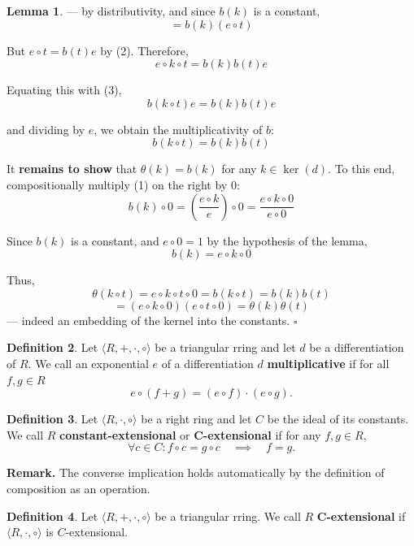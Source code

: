 \documentclass[12pt]{article}
\theoremstyle{definition}
\newtheorem{definition}{Definition}[section]
\newtheorem{lemma}[definition]{Lemma}
\begin{document}
\begin{lemma}
--- by distributivity, and since \(b(k)\) is a constant,
\[
= b(k) (e \circ t)
\]

But \(e \circ t = b(t) e\) by (2). Therefore,
\[
e \circ k \circ t = b(k) b(t) e
\]

Equating this with (3),
\[
b(k \circ t) e = b(k) b(t) e
\]

and dividing by \(e\), we obtain the multiplicativity of \(b\):
\[
b(k \circ t) = b(k) b(t)
\]

\vspace{10pt}
It \textbf{remains to show} that \(\theta(k) = b(k)\) for any \(k \in \ker(d)\). 
To this end, compositionally multiply (1) on the right by \(0\):
\[
b(k) \circ 0 = \left( \frac{e \circ k}{e} \right) \circ 0 = \frac{e \circ k \circ 0}{e \circ 0}
\]

Since \(b(k)\) is a constant, and \(e \circ 0 = 1\) by the hypothesis of the lemma,
\[
b(k) = e \circ k \circ 0
\]

Thus,
\[
\theta(k \circ t) = e \circ k \circ t \circ 0 = b(k \circ t) = b(k) b(t) 
\]
\[
= (e \circ k \circ 0)(e \circ t \circ 0) = \theta(k) \theta(t)
\]
--- indeed an embedding of the kernel into the constants. $\square$

\end{lemma}

\vspace{10pt}
\begin{definition} 
Let \(\langle R, +, \cdot, \circ \rangle\) be a triangular rring and let \(d\) be a differentiation of $R$.
We call an exponential \(e\) of a differentiation \(d\) \textbf{multiplicative} if for all \(f, g \in R\)
\[
e \circ (f + g) = (e \circ f) \cdot (e \circ g).
\]
\end{definition}

\vspace{10pt}
\begin{definition}
Let \(\langle R, \cdot, \circ \rangle\) be a right ring and let \(C\) be the ideal of its constants. 
We call \(R\) \textbf{constant-extensional} or \textbf{C-extensional} if for any \(f, g \in R\),
\[
\forall c \in C: f \circ c = g \circ c \quad \implies \quad f = g.
\]
\end{definition}

\vspace{10pt}
\noindent\textbf{Remark.} The converse implication holds automatically by the definition of composition as an operation.

\vspace{10pt}
\begin{definition}
Let \(\langle R, +, \cdot, \circ \rangle\) be a triangular rring. We call \(R\) 
\textbf{C-extensional} if \(\langle R, \cdot, \circ \rangle\) is \(C\)-extensional.
\end{definition}
\end{document}

